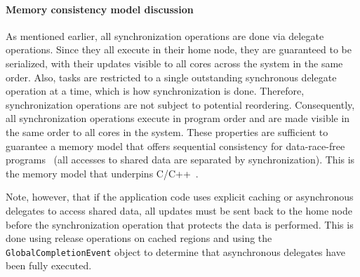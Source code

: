 \paragraph{Memory consistency model discussion} As mentioned earlier, all
synchronization operations are done via delegate operations. Since they all
execute in their home node, they are guaranteed to be serialized, with their
updates visible to all cores across the system in the same order. Also, tasks
are restricted to a single outstanding synchronous delegate operation at a
time, which is how synchronization is done. Therefore, synchronization operations are not subject to potential reordering. 
Consequently, all synchronization operations execute in program order and are
made visible in the same order to all cores in the system. These properties
are sufficient to guarantee a memory model that offers sequential consistency
for data-race-free programs~\cite{AdveHill1990} (all accesses to shared data
are separated by synchronization). This is the memory model that underpins
C/C++~\cite{N2480,N2800}.

Note, however, that if the application code uses explicit caching or
asynchronous delegates to access shared data, all updates must be sent back to
the home node before the synchronization operation that protects the data is
performed. This is done using release operations on cached regions and using
the \texttt{GlobalCompletionEvent} object to determine that asynchronous
delegates have been fully executed.




